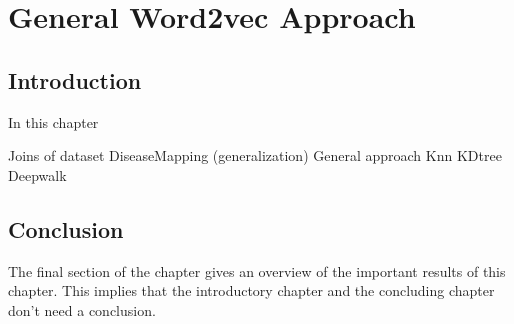 \graphicspath{ {Approach/Images/} }


\chapter{General Word2vec Approach}
\label{cha:approach}

\section{Introduction}
In this chapter 

Joins of dataset
DiseaseMapping (generalization)
General approach 
Knn
KDtree
Deepwalk




\section{Conclusion}
The final section of the chapter gives an overview of the important results
of this chapter. This implies that the introductory chapter and the
concluding chapter don't need a conclusion.



